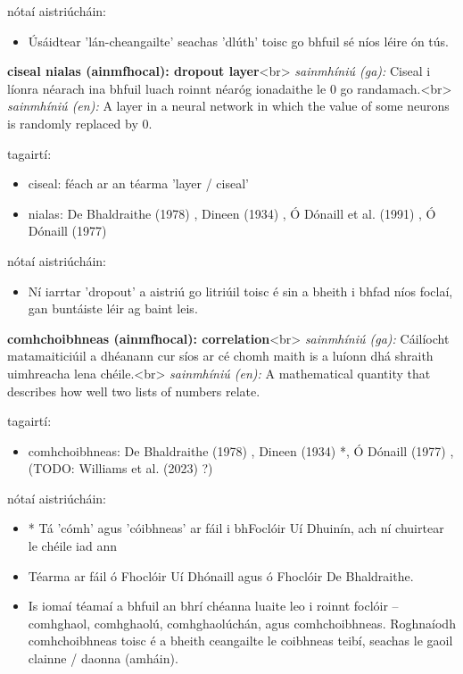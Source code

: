 \documentclass{article}
\begin{document}
nótaí aistriúcháin:
\begin{itemize}
	\item Úsáidtear 'lán-cheangailte' seachas 'dlúth' toisc go bhfuil sé níos léire ón tús.
\end{itemize}


\textbf{ciseal nialas (ainmfhocal): dropout layer}<br>
\textit{sainmhíniú (ga):} Ciseal i líonra néarach ina bhfuil luach roinnt néaróg ionadaithe le 0 go randamach.<br>
\textit{sainmhíniú (en):} A layer in a neural network in which the value of some neurons is randomly replaced by 0.

tagairtí:
\begin{itemize}
	\item ciseal: féach ar an téarma 'layer / ciseal'
	\item nialas: De Bhaldraithe (1978) \cite{de-bhaldraithe}, Dineen (1934) \cite{dineen}, Ó Dónaill et al. (1991) \cite{focloir-beag}, Ó Dónaill (1977) \cite{odonaill}
\end{itemize}

nótaí aistriúcháin:
\begin{itemize}
	\item Ní iarrtar 'dropout' a aistriú go litriúil toisc é sin a bheith i bhfad níos foclaí, gan buntáiste léir ag baint leis.
\end{itemize}


\textbf{comhchoibhneas (ainmfhocal): correlation}<br>
\textit{sainmhíniú (ga):} Cáilíocht matamaiticiúil a dhéanann cur síos ar cé chomh maith is a luíonn dhá shraith uimhreacha lena chéile.<br>
\textit{sainmhíniú (en):} A mathematical quantity that describes how well two lists of numbers relate.

tagairtí:
\begin{itemize}
	\item comhchoibhneas: De Bhaldraithe (1978) \cite{de-bhaldraithe}, Dineen (1934) \cite{dineen}*, Ó Dónaill (1977) \cite{odonaill}, (TODO: Williams et al. (2023) \cite{storchiste}?)
\end{itemize}

nótaí aistriúcháin:
\begin{itemize}
	\item * Tá 'cómh' agus 'cóibhneas' ar fáil i bhFoclóir Uí Dhuinín, ach ní chuirtear le chéile iad ann
	\item Téarma ar fáil ó Fhoclóir Uí Dhónaill agus ó Fhoclóir De Bhaldraithe.
	\item Is iomaí téamaí a bhfuil an bhrí chéanna luaite leo i roinnt foclóir -- comhghaol, comhghaolú, comhghaolúchán, agus comhchoibhneas. Roghnaíodh comhchoibhneas toisc é a bheith ceangailte le coibhneas teibí, seachas le gaoil clainne / daonna (amháin).
\end{itemize}
\end{document}
